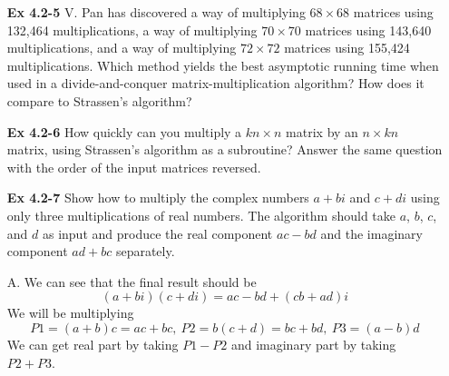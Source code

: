 \documentclass[fontsize=12pt,paper=a4]{book}
\begin{document}
\begin{enumerate}
	\item[\textbf{Ex 4.2-5}]
		V. Pan has discovered a way of multiplying $68 \times 68$ matrices using 132,464 multiplications, a way of multiplying $70 \times 70$ matrices using 143,640 multiplications, and a way of multiplying $72 \times 72$ matrices using 155,424 multiplications. Which method yields the best asymptotic running time when used in a divide-and-conquer matrix-multiplication algorithm? How does it compare to Strassen’s algorithm?	
	
	\item[\textbf{Ex 4.2-6}]
		How quickly can you multiply a $k n \times n$ matrix by an $n \times k n$ matrix, using Strassen’s algorithm as a subroutine? Answer the same question with the order of the input matrices reversed.
		
	\item[\textbf{Ex 4.2-7}]
		Show how to multiply the complex numbers $a + bi$ and $c + di$ using only three multiplications of real numbers. The algorithm should take $a$, $b$, $c$, and $d$ as input and produce the real component $ac - bd$ and the imaginary component $ad + bc$ separately.
	\item[A.]
	We can see that the final result should be
	\[ (a+bi) (c+di) = ac-bd+(cb + ad)i \]
	We will be multiplying \\
	\[ P1 = (a+b)c = ac + bc,\ P2 = b(c+d) = bc + bd,\ P3 = (a-b)d \]
	We can get real part by taking $P1-P2$ and imaginary part by taking $P2+P3$.
\end{enumerate}
\end{document}
